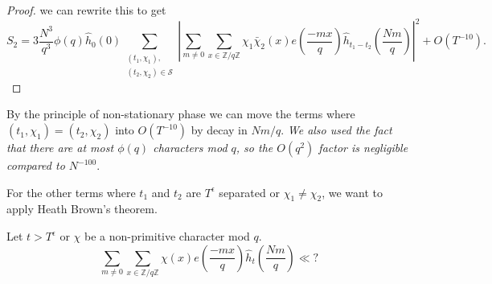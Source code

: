 \begin{proof}
    we can rewrite this to get
    \fi
    \[
        S_2 = 3\frac{N^3}{q^3} \phi(q) \hat{h}_{0}\left(0\right) \sum_{\substack{(t_1,\chi_1),\\(t_2,\chi_2)\in\mathcal{S}}} \left|\sum_{m\neq 0} \sum_{x \in \mathbb{Z}/q\mathbb{Z}}\chi_1\bar{\chi}_2(x) e\left(\frac{-mx}{q}\right)
         \hat{h}_{t_1-t_2}\left(\frac{Nm}{q}\right)\right|^2 + O(T^{-10}).
    \]
\end{proof}

By the principle of non-stationary phase we can move the terms where $(t_1,\chi_1)=(t_2,\chi_2)$ into $O(T^{-10})$ by decay in $Nm/q$. \textit{We also used the fact that there are at most $\phi(q)$ characters mod $q$, so the $O(q^2)$ factor is negligible compared to $N^{-100}$}.

For the other terms where $t_1$ and $t_2$ are $T^\epsilon$ separated or $\chi_1\neq \chi_2$, we want to apply Heath Brown's theorem. 
\begin{lemma}
    Let $t>T^\epsilon$ or $\chi$ be a non-primitive character mod $q$.
    \[
        \sum_{m\neq 0} \sum_{x \in \mathbb{Z}/q\mathbb{Z}}\chi(x) e\left(\frac{-mx}{q}\right)
        \hat{h}_{t}\left(\frac{Nm}{q}\right)\ll ?
    \]
\end{lemma}
